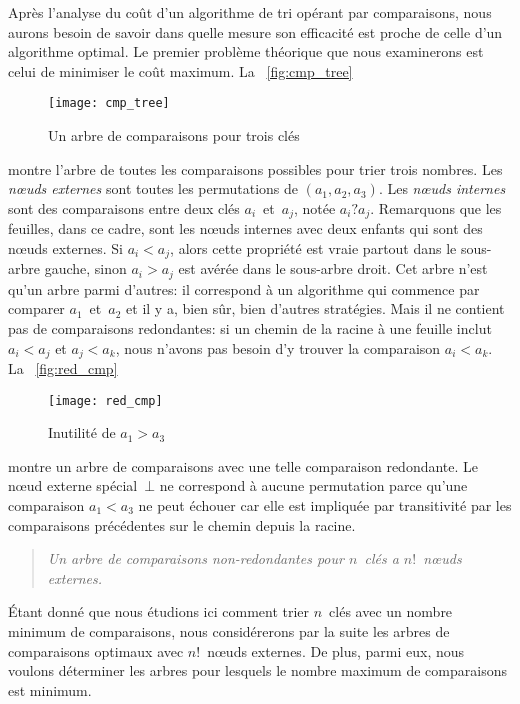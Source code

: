 Après l'analyse du coût d'un algorithme de tri opérant par
comparaisons, nous aurons besoin de savoir dans quelle mesure son
efficacité est proche de celle d'un algorithme
optimal. Le premier problème théorique que
nous examinerons est celui de minimiser le coût maximum. La
\fig~\vref{fig:cmp_tree}
\begin{figure}
\centering
\texttt{[image: cmp\_tree]}
\caption{Un arbre de comparaisons pour trois clés}
\label{fig:cmp_tree}
\end{figure}
montre l'arbre de toutes les comparaisons possibles
 pour trier trois
nombres. Les \emph{n{\oe}uds externes}
\label{def:external_node} sont toutes les
permutations de \((a_1,a_2,a_3)\). Les
\emph{n{\oe}uds internes} sont
des comparaisons entre deux clés \(a_i\)~et~\(a_j\), notée
\(a_i?a_j\). Remarquons que les feuilles, dans ce cadre, sont les
n{\oe}uds internes avec deux enfants qui sont des n{\oe}uds externes.
Si \({a_i < a_j}\), alors cette propriété est vraie partout dans le
sous-arbre gauche, sinon \({a_i > a_j}\) est avérée dans le sous-arbre
droit. Cet arbre n'est qu'un arbre parmi d'autres: il correspond à un
algorithme qui commence par comparer \(a_1\)~et~\(a_2\) et il y a,
bien sûr, bien d'autres stratégies. Mais il ne contient pas de
comparaisons redondantes: si un chemin de la racine à une feuille
inclut \({a_i < a_j}\) et \({a_j < a_k}\), nous n'avons pas besoin d'y
trouver la comparaison \({a_i < a_k}\). La \fig~\vref{fig:red_cmp}
\begin{figure}
\centering
\texttt{[image: red\_cmp]}
\caption{Inutilité de \(a_1 > a_3\)}
\label{fig:red_cmp}
\end{figure}
montre un arbre de comparaisons avec une telle comparaison
redondante. Le n{\oe}ud externe spécial~\(\bot\) ne correspond à
aucune permutation parce qu'une comparaison \({a_1 < a_3}\) ne peut
échouer car elle est impliquée par transitivité par les comparaisons
précédentes sur le chemin depuis la racine.
\begin{quote}
  \emph{Un arbre de comparaisons non-redondantes pour \(n\)~clés
    a \(n!\)~n{\oe}uds externes.}
\end{quote}
Étant donné que nous étudions ici comment trier \(n\)~clés avec un
nombre minimum de comparaisons, nous considérerons par la suite les
arbres de comparaisons optimaux avec \(n!\)~n{\oe}uds externes. De
plus, parmi eux, nous voulons déterminer les arbres pour lesquels le
nombre maximum de comparaisons est minimum.

